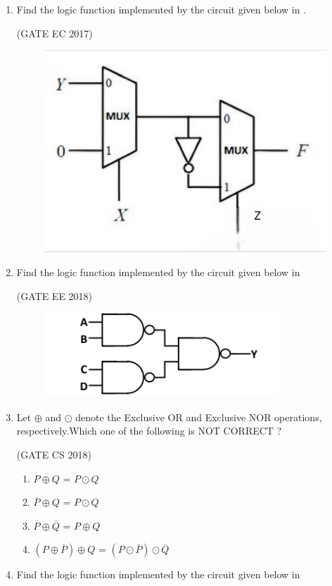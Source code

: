 \begin{enumerate}[label=\arabic*.,ref=\theenumi]
\item 
\label{prob:2017-gate-ec-16}
Find the logic function implemented by the circuit given below 
in 
.

\hfill (GATE EC 2017)
\begin{figure}[H]
\centering
	\includegraphics[width=0.5\columnwidth]{figs/2017-gate-ec-16.png}
\caption{}
\label{fig:2017-gate-ec-16}
\end{figure}
\item 
\label{prob:2018-gate-ee-14}
Find the logic function implemented by the circuit given below 
in 

\hfill (GATE EE 2018)
\begin{figure}[H]
\centering
	\includegraphics[width=0.5\columnwidth]{figs/2018-gate-ee-14.png}
\caption{}
\label{fig:2018-gate-ee-14}
\end{figure}
\item 
\label{prob:2018-gate-CS-4}		
Let $\oplus$ and $\odot$ denote the Exclusive OR and Exclusive NOR operations, respectively.Which one of the following is NOT CORRECT ?

\hfill (GATE CS 2018)
\begin{enumerate}[label=(\Alph*)]
    \item $\overline{P\oplus Q}$ = $ P \odot Q $
    \item $\overline{P} \oplus Q$ = $ P \odot Q $
    \item $\overline{P} \oplus \overline{Q}$ = $ P \oplus Q $
    \item $(P \oplus \overline{P}) \oplus Q$ = $(P \odot \overline{P}) \odot \overline{Q}$
\end{enumerate}
\item 
\label{prob:2019-gate-ee-36}
Find the logic function implemented by the circuit given below 
in 


\end{enumerate}
